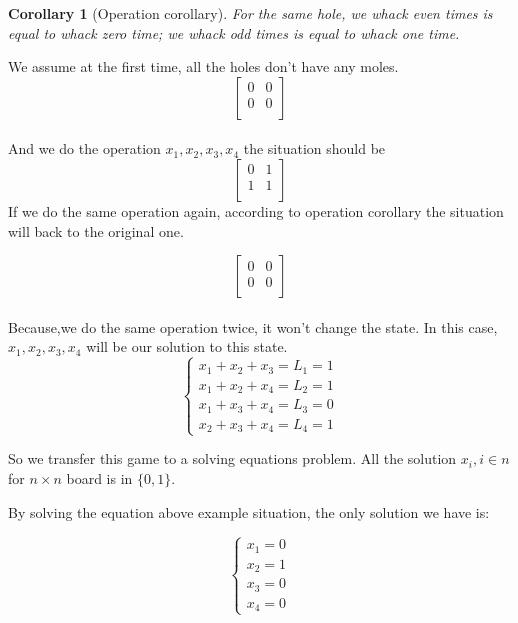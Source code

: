 \documentclass[A4,12pt]{article}
\newtheorem{corollary}{Corollary}[section]
\begin{document}
\begin{enumerate}[6.]
\begin{enumerate}[8.]
\begin{enumerate}[9.]
\begin{corollary}[Operation corollary]
\label{operation corollary}
For the same hole, we whack even times is equal to whack zero time; we whack odd times is equal to whack one time.
\end{corollary}

We assume at the first time, all the holes don't have any moles.
\[ \begin{bmatrix}
0 & 0   \\
  0 & 0   \\
\end{bmatrix}
\]\\
 And we do the operation $x_{1}, x_{2}, x_{3}, x_{4}$ the situation should be
\[ \begin{bmatrix}
0 & 1   \\
  1 & 1   \\
\end{bmatrix}
\]
If we do the same operation again, according to operation corollary the situation will back to the original one.

\[ \begin{bmatrix}
0 & 0   \\
  0 & 0   \\
\end{bmatrix}
\]\\
Because,we do the same operation twice, it won't change the state. In this case, $x_{1}, x_{2}, x_{3}, x_{4}$ will be our solution to this state.
\begin{equation}
  \left\{
  \begin{array}{lr}
    x_1+x_2+x_3=L_1=1\\
    x_1+x_2+x_4=L_2=1\\
    x_1+x_3+x_4=L_3=0\\
    x_2+x_3+x_4=L_4=1
  \end{array}
  \right.
\end{equation}

So we transfer this game to a solving equations problem. All the solution $x_i,  i\in n$ for $n\times n$ board is in $\{0, 1\}$.

By solving the equation above example situation, the only solution we have is:

 \begin{equation}
  \left\{
  \begin{array}{lr}
    x_1=0\\
    x_2=1\\
    x_3=0\\
    x_4=0
  \end{array}
  \right.
 \end{equation}


\end{enumerate}
\end{enumerate}
\end{enumerate}
\end{document}
